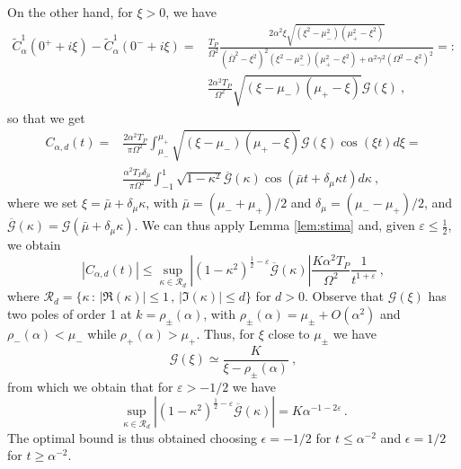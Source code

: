 \documentclass[11pt]{article}
\numberwithin{equation}{section}
\numberwithin{theorem}{section}
\newcommand{\e}{\varepsilon}
\def\tilde#1{\widetilde{#1}}
\begin{document}
On the other hand, for $\xi>0$, we have
%
\begin{equation}\label{eq:Hacca}
\begin{aligned}
\tilde C^1_\alpha(0^++i\xi)-\tilde C^1_\alpha(0^-+i\xi)=
&\frac{T_P}{\Omega^2}\frac{2\alpha^2 \xi\sqrt{(\xi^2-\mu_-^2)(\mu_+^2-\xi^2)}}
{(\overline \Omega^2-\xi^2)^2(\xi^2-\mu_-^2)(\mu_+^2-\xi^2)+\alpha^2\gamma^2(\Omega^2-\xi^2)^2}=:\\
&\frac{2\alpha^2 T_P}{\Omega^2}\sqrt{(\xi-\mu_-)(\mu_+-\xi)}\mathcal
G(\xi)\ ,
\end{aligned}
\end{equation}
%
so that we get
%
\begin{equation}\label{eq:Bessel}
\begin{aligned}
 C_{\alpha,d}(t)=&\frac{2\alpha^2 T_P}{\pi\Omega^2}\int_{\mu_-}^{\mu_+}
\sqrt{(\xi-\mu_-)\left(\mu_+-\xi\right)}\mathcal G(\xi)\cos(\xi t)d\xi=\\
&\frac{\alpha^2 T_P\delta_\mu}{\pi\Omega^2}\int_{-1}^{1}\sqrt{1-\kappa^2}\overline
{\mathcal G}(\kappa)
\cos(\bar \mu t + \delta_\mu \kappa t)d\kappa\ ,
\end{aligned}
\end{equation}
%
where we set $\xi=\bar \mu+\delta_\mu \kappa$, with $\bar \mu=(\mu_-+\mu_+)/2$ and $\delta_\mu=(\mu_--\mu_+)/2$, and
$\overline {\mathcal G}(\kappa)=\mathcal G(\bar \mu+\delta_\mu \kappa)$. We can thus apply Lemma \ref{lem:stima} and,
given $\e\leq \frac12$, we obtain
\begin{equation}\label{eq:optimal}
|C_{\alpha,d}(t)|\leq \sup_{\kappa\in\mathcal R_d}
\left|(1-\kappa^2)^{\frac12-\e}\overline {\mathcal G}(\kappa)\right|
\frac{K\alpha^2 T_P}{\Omega^2}
\frac 1{t^{1+\e}}\ ,
\end{equation}
where $\mathcal R_d=\{\kappa\,:\, |\Re(\kappa)|\leq 1\,,\, |\Im(\kappa)|\leq d\}$ for $d>0$. Observe that $\mathcal
G(\xi)$ has two poles of order 1 at $k=\rho_\pm(\alpha)$, with $\rho_\pm(\alpha)=\mu_\pm+O(\alpha^2)$ and
$\rho_-(\alpha)<\mu_-$ while $\rho_+(\alpha)>\mu_+$. Thus, for $\xi$ close to $\mu_\pm$ we have
\begin{equation}\label{eq:near}
 \mathcal G(\xi)\simeq \frac{K}{\xi-\rho_\pm(\alpha)}\ ,
\end{equation}
from which we obtain that for $\e>-1/2$ we have
\[
\sup_{\kappa\in\mathcal R_d}
\left|(1-\kappa^2)^{\frac12-\e}\overline {\mathcal G}(\kappa)\right|=K\alpha^{-1-2\e}\, .
\]
The optimal bound is thus obtained choosing $\epsilon=-1/2$ for $t\leq \alpha^{-2}$ and
$\epsilon=1/2$ for $t\geq \alpha^{-2}$.
\end{document}
